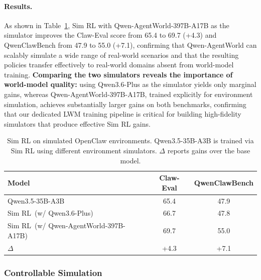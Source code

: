 \documentclass{llmxive}
\providecommand{\method}{Qwen-AgentWorld\xspace}
\begin{document}
\paragraph{Results.}
As shown in Table~\ref{tab:openclaw_simrl}, Sim RL with \method-397B-A17B as the simulator improves the Claw-Eval score from 65.4 to 69.7 (+4.3) and QwenClawBench from 47.9 to 55.0 (+7.1), confirming that \method can scalably simulate a wide range of real-world scenarios and that the resulting policies transfer effectively to real-world domains absent from world-model training.
\textbf{Comparing the two simulators reveals the importance of world-model quality:} using Qwen3.6-Plus as the simulator yields only marginal gains, whereas \method-397B-A17B, trained explicitly for environment simulation, achieves substantially larger gains on both benchmarks, confirming that our dedicated LWM training pipeline is critical for building high-fidelity simulators that produce effective Sim RL gains.


\begin{table}[ht]
\centering
\small
\begin{tabular}{@{}l cc@{}}
\toprule
\textbf{Model} & \textbf{Claw-Eval} & \textbf{QwenClawBench} \\
\midrule
Qwen3.5-35B-A3B          & 65.4 & 47.9 \\
\quad\quad Sim RL~(w/ Qwen3.6-Plus)           & 66.7 & 47.8 \\
\quad\quad Sim RL~(w/ \method-397B-A17B)           & 69.7 & 55.0 \\
\midrule
\quad\quad $\Delta$           & +4.3 & +7.1 \\
\bottomrule
\end{tabular}
\caption{Sim RL on simulated OpenClaw environments. Qwen3.5-35B-A3B is trained via Sim RL using different environment simulators. $\Delta$ reports gains over the base model.}
\label{tab:openclaw_simrl}
\end{table}



\subsubsection{Controllable Simulation}
\label{sec:app:controllable}
\end{document}
